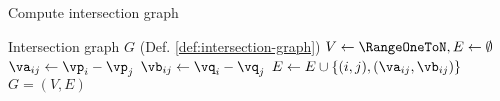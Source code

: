 \begin{algorithm}[!ht]
	\caption{Compute intersection graph}
	\label{alg:intersection-graph}
	\begin{algorithmic}[1]
		\Ensure Intersection graph $G$ (Def. \ref{def:intersection-graph})
		\hypertarget{ref:glob}{
			}
        \State $V \gets \RangeOneToN, E \gets \emptyset$
                \State $\va_{ij} \gets \vp_i - \vp_j$
                \State $\vb_{ij} \gets \vq_i - \vq_j$
                    \State $E \gets E \cup \{(i, j), (\va_{ij}, \vb_{ij})\}$
                \EndIf
            \EndFor
        \EndFor
        \State \Return $G = (V, E)$
		\EndFunction
	\end{algorithmic}
\end{algorithm}
